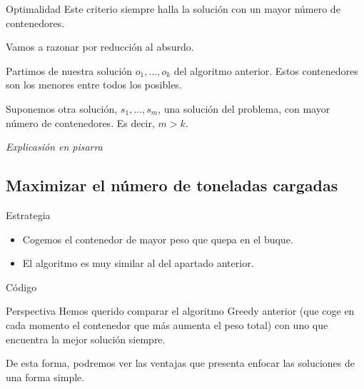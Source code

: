 \begin{frame}{Optimalidad}
Este criterio siempre halla la solución con un mayor número de contenedores.

Vamos a razonar por reducción al absurdo.

\pause
Partimos de nuestra solución  $o_1, \dots, o_k$ del algoritmo anterior. Estos contenedores son los menores entre todos los posibles.

Suponemos otra solución, $s_1, \dots, s_m$, una solución del problema, con mayor número de contenedores. Es decir, $m > k$.


\begin{center}
	\textit{Explicasión en pisarra}
\end{center}
\end{frame}

\subsection{Maximizar el número de toneladas cargadas}

\begin{frame}{Estrategia}
\begin{itemize}
  \item Cogemos el contenedor de mayor peso que quepa en el buque.
  \item El algoritmo es muy similar al del apartado anterior.
\end{itemize}
\end{frame}

\begin{frame}[fragile]{Código}

\end{frame}

\begin{frame}{Perspectiva}
	Hemos querido comparar el algoritmo Greedy anterior (que coge en cada momento el contenedor que más aumenta el peso total) con uno que encuentra la mejor solución siempre.
	\vspace{1cm}
	
	De esta forma, podremos ver las ventajas que presenta enfocar las soluciones de una forma simple.
\end{frame}

